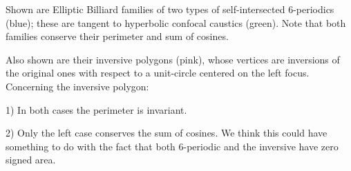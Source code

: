 Shown are Elliptic Billiard families of two types of self-intersected 6-periodics (blue); these are tangent to hyperbolic confocal caustics (green). Note that both families conserve their perimeter and sum of cosines.

Also shown are their inversive polygons (pink), whose vertices are inversions of the original ones with respect to a unit-circle centered on the left focus. Concerning the inversive polygon:

1) In both cases the perimeter is invariant.

2) Only the left case conserves the sum of cosines. We think this could have something to do with the fact that both 6-periodic and the inversive have zero signed area.